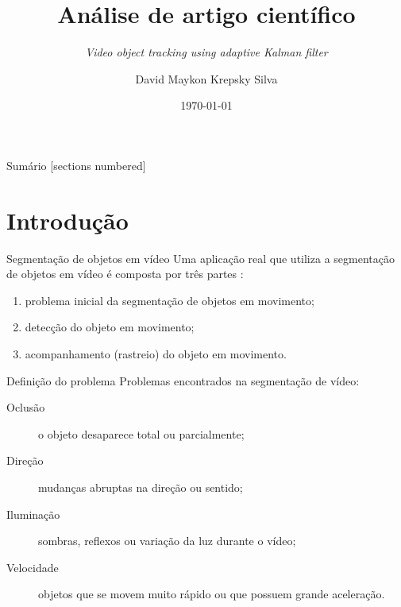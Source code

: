 \documentclass[10pt]{beamer}
\title{Análise de artigo científico}
\subtitle{\textit{Video object tracking using adaptive Kalman filter}}
\date{\today}
\author{David Maykon Krepsky Silva}
\institute{Departamento de Computação - Mestrado - UEL}
\begin{document}
\maketitle

\begin{frame}{Sumário}
  [sections numbered]
  \tableofcontents[hideallsubsections]
\end{frame}

\section{Introdução}
\begin{frame}{Segmentação de objetos em vídeo}
Uma aplicação real que utiliza a segmentação de objetos em vídeo é composta por três partes \cite{Weng2006}:

\begin{enumerate}
	\item problema inicial da segmentação de objetos em movimento; %
	
	\item detecção do objeto em movimento;
	
	\item acompanhamento (rastreio) do objeto em movimento.
\end{enumerate}
\end{frame}
\begin{frame}[fragile]{Definição do problema}
	Problemas encontrados na segmentação de vídeo:
	
 	\begin{description}
		\item[Oclusão] o objeto desaparece total ou parcialmente;
		
		\item[Direção] mudanças abruptas na direção ou sentido;
			
		\item[Iluminação] sombras, reflexos ou variação da luz durante o vídeo;
		
		\item[Velocidade] objetos que se movem muito rápido ou que possuem grande aceleração.
	\end{description}
\end{frame}
\end{document}
